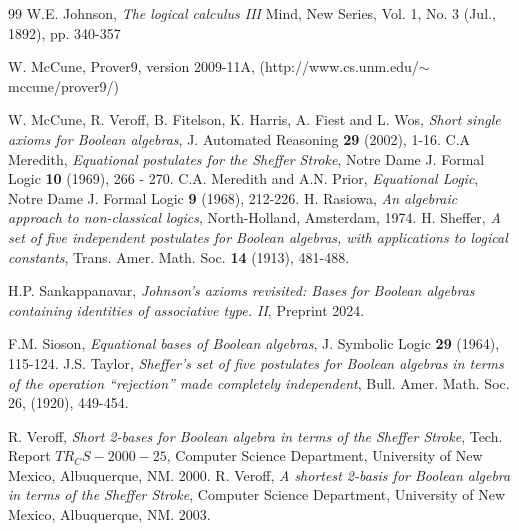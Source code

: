 \documentclass{amsart}
\theoremstyle{plain}
\theoremstyle{problem}
\theoremstyle{definition}
\theoremstyle{remark}
\numberwithin{equation}{section}
\begin{document}
\begin{thebibliography}{99}
  W.E. Johnson, \emph{The logical calculus III}
   Mind, New Series, Vol. 1, No. 3 (Jul., 1892), pp. 340-357
   
   W. McCune, Prover9, version 2009-11A, (http://www.cs.unm.edu/$\sim$mccune/prover9/)
   
   W. McCune, R. Veroff, B. Fitelson, K. Harris, A. Fiest and L. Wos, \emph{Short single axioms for Boolean algebras},
   J. Automated Reasoning \textbf{29} (2002), 1-16.
   C.A Meredith,  \emph{Equational postulates for the Sheffer Stroke}, Notre Dame J. Formal Logic \textbf{10} (1969), 266 - 270.
   C.A. Meredith and A.N. Prior, \emph{Equational Logic},
   Notre Dame J. Formal Logic  \textbf{9} (1968), 212-226.
   H. Rasiowa, \emph{An algebraic approach to non-classical logics},
   North-Holland, Amsterdam, 1974.
   H. Sheffer, \emph{A set of five independent postulates for Boolean algebras, with applications to logical constants}, Trans. Amer. Math. Soc. \textbf{14} (1913), 481-488.

H.P. Sankappanavar,
\emph{Johnson's axioms revisited: Bases for Boolean algebras containing identities of associative type. II},  Preprint 2024.

   F.M. Sioson, \emph{Equational bases of Boolean algebras}, J. Symbolic Logic \textbf{29} (1964), 115-124.
   J.S. Taylor, \emph{Sheffer's set of five postulates for Boolean algebras in terms of the operation ``rejection''  made completely independent}, Bull. Amer. Math. Soc. 26, (1920), 449-454.
   
   R. Veroff, \emph{Short 2-bases for Boolean algebra in terms of the Sheffer Stroke}, Tech. Report
   $TR_CS-2000-25$, Computer Science Department, University of New Mexico, Albuquerque, NM. 2000.
   R. Veroff, \emph{A shortest 2-basis for Boolean algebra in terms of the Sheffer Stroke}, 
    Computer Science Department, University of New Mexico, Albuquerque, NM. 2003.
\end{thebibliography}
\end{document}

